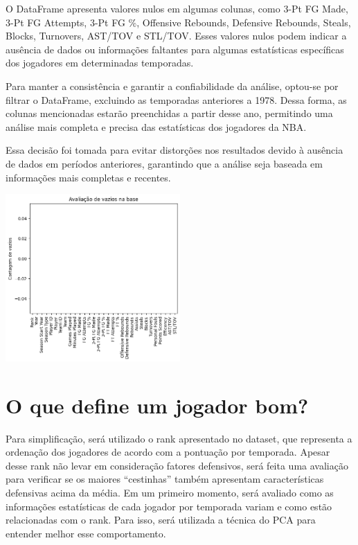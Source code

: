 \documentclass[
]{book}
\begin{document}
O DataFrame apresenta valores nulos em algumas colunas, como 3-Pt FG Made, 3-Pt FG Attempts, 3-Pt FG \%, Offensive Rebounds, Defensive Rebounds, Steals, Blocks, Turnovers, AST/TOV e STL/TOV. Esses valores nulos podem indicar a ausência de dados ou informações faltantes para algumas estatísticas específicas dos jogadores em determinadas temporadas.

Para manter a consistência e garantir a confiabilidade da análise, optou-se por filtrar o DataFrame, excluindo as temporadas anteriores a 1978. Dessa forma, as colunas mencionadas estarão preenchidas a partir desse ano, permitindo uma análise mais completa e precisa das estatísticas dos jogadores da NBA.

Essa decisão foi tomada para evitar distorções nos resultados devido à ausência de dados em períodos anteriores, garantindo que a análise seja baseada em informações mais completas e recentes.

\includegraphics[width=0.5\textwidth,height=\textheight]{imagens/2.png}

\hypertarget{o-que-define-um-jogador-bom}{%
\chapter{O que define um jogador bom?}\label{o-que-define-um-jogador-bom}}

Para simplificação, será utilizado o rank apresentado no dataset, que representa a ordenação dos jogadores de acordo com a pontuação por temporada. Apesar desse rank não levar em consideração fatores defensivos, será feita uma avaliação para verificar se os maiores ``cestinhas'' também apresentam características defensivas acima da média.
Em um primeiro momento, será avaliado como as informações estatísticas de cada jogador por temporada variam e como estão relacionadas com o rank. Para isso, será utilizada a técnica do PCA para entender melhor esse comportamento.
\end{document}
